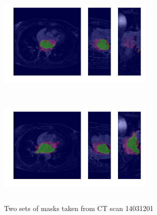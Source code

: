 \begin{figure}[H]
\centering
\label{final_model}
\begin{minipage}{0.45\textwidth}
\centering
{\includegraphics[trim=0cm 2cm 0cm 2cm, clip=true, height=50mm, width=75mm]{Appendix/img/Masks_for_14031201_0.png}}
\end{minipage}\hfill
\begin{minipage}{0.45\textwidth}
\centering
{\includegraphics[trim=0cm 2cm 0cm 2cm, clip=true, height=50mm, width=75mm]{Appendix/img/Masks_for_14031201_1.png}}
\end{minipage}
\caption{Two sets of masks taken from CT scan 14031201}
\end{figure}

